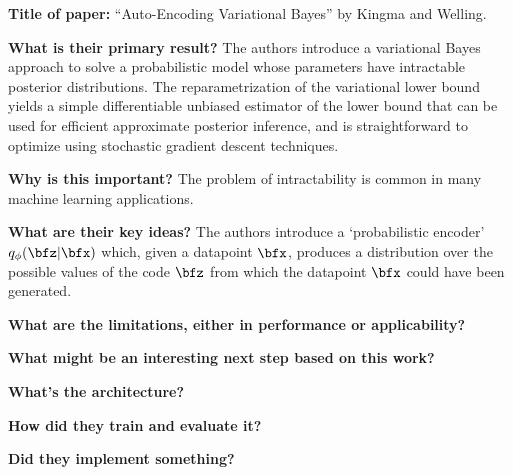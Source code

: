 \noindent \textbf{Title of paper:} ``Auto-Encoding Variational Bayes'' by Kingma and Welling. 

\noindent\textbf{What is their primary result?} The authors introduce a
variational Bayes approach to solve a probabilistic model whose parameters have
intractable posterior distributions. The reparametrization of the variational
lower bound yields a simple differentiable unbiased estimator of the lower bound
that can be used for efficient approximate posterior inference, and is
straightforward to optimize using stochastic gradient descent techniques.

\noindent\textbf{Why is this important?} The problem of intractability is common
in many machine learning applications.

\noindent\textbf{What are their key ideas?} The authors introduce a
`probabilistic encoder' $q_\phi(\bfz|\bfx)$ which, given a datapoint $\bfx$,
produces a distribution over the possible values of the code $\bfz$ from which
the datapoint $\bfx$ could have been generated. 


\noindent\textbf{What are the limitations, either in performance or applicability?}

\noindent\textbf{What might be an interesting next step based on this work?}

\noindent\textbf{What's the architecture?}

\noindent\textbf{How did they train and evaluate it?}

\noindent\textbf{Did they implement something?}


